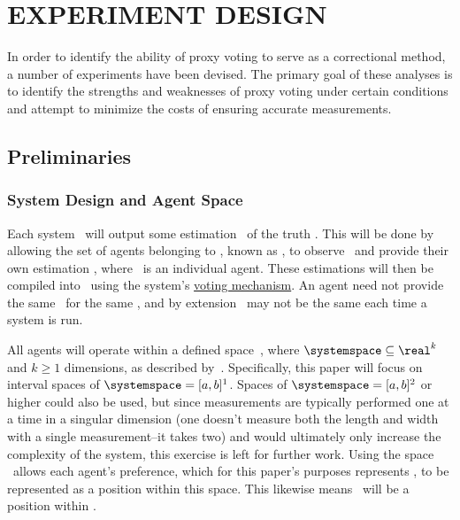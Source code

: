 %
%

\chapter{EXPERIMENT DESIGN}\label{ch:experiment-design}
In order to identify the ability of proxy voting to serve as a correctional
method, a number of experiments have been devised.
The primary goal of these analyses is to identify the strengths and
weaknesses of proxy voting under certain conditions and attempt to minimize
the costs of ensuring accurate measurements.


\section{Preliminaries}\label{sec:preliminaries}

\subsection{System Design and Agent Space}\label{subsec:system-design-and
-agent-space}
Each system \system\ will output some estimation \systemtruth\ of the truth
\truth.
This will be done by allowing the set of agents belonging to \system,
known as \systemagents, to observe \truth\ and provide their
own estimation \agenttruth, where \agent\ is an individual agent.
These estimations will then be compiled into \systemtruth\ using
the system's \hyperref[subsec:voting-mechanisms]{voting mechanism}.
An agent need not provide the same \agenttruth\ for the same \truth,
and by extension \systemtruth\ may not be the same each time a
system is run.

All agents will operate within a defined space~\systemspace, where
$\systemspace \subseteq \real^k$ and $k \geq 1$ dimensions, as described
by~\cite[para.~2.1]{Cohensius2017}.
Specifically, this paper will focus on interval spaces of
$\systemspace = [a, b]^1$.
Spaces of $\systemspace = [a, b]^2$ or higher could also be used, but since
measurements are typically performed one at a time in a singular dimension (one
doesn't measure both the length and width with a single measurement--it takes
two) and would ultimately only increase the complexity of the system, this
exercise is left for further work.
Using the space \systemspace\ allows each agent's preference, which for this
paper's purposes represents \agenttruth, to be represented as a position within
this space.
This likewise means \systemtruth\ will be a position within \systemspace.


